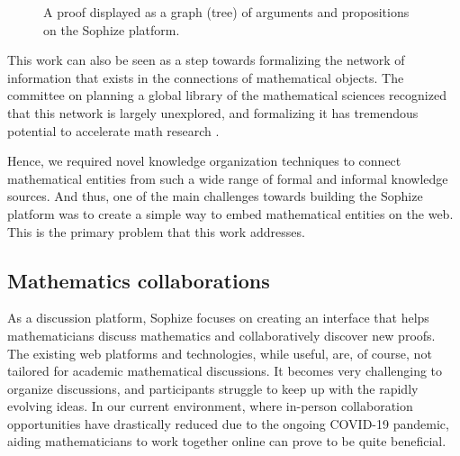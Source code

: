 \documentclass[]{ceurart}
\begin{document}
\begin{figure}[ht]
\begin{center}
\caption{A proof displayed as a graph (tree) of arguments and propositions on the Sophize platform.}
\label{proof_tree}
\end{center}
\end{figure}

This work can also be seen as a step towards formalizing the network of information that exists in the connections of mathematical objects. The committee on planning a global library of the mathematical sciences recognized that this network is largely unexplored, and formalizing it has tremendous potential to accelerate math research \cite{sciences2014developing}.

Hence, we required novel knowledge organization techniques to connect mathematical entities from such a wide range of formal and informal knowledge sources. And thus, one of the main challenges towards building the Sophize platform was to create a simple way to embed mathematical entities on the web. This is the primary problem that this work addresses.

\subsection*{Mathematics collaborations}

As a discussion platform, Sophize focuses on creating an interface that helps mathematicians discuss mathematics and collaboratively discover new proofs. The existing web platforms and technologies, while useful, are, of course, not tailored for academic mathematical discussions. It becomes very challenging to organize discussions, and participants struggle to keep up with the rapidly evolving ideas. In our current environment, where in-person collaboration opportunities have drastically reduced due to the ongoing COVID-19 pandemic, aiding mathematicians to work together online can prove to be quite beneficial.
\end{document}
